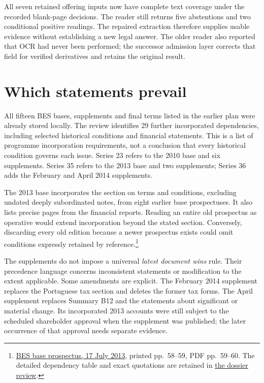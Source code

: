 \documentclass[11pt,a4paper]{article}
\begin{document}
All seven retained offering inputs now have complete text coverage under the
recorded blank-page decisions. The reader still returns five abstentions and
two conditional positive readings. The repaired extraction therefore supplies
usable evidence without establishing a new legal answer. The older reader also
reported that OCR had never been performed; the successor admission layer
corrects that field for verified derivatives and retains the original result.

\section*{Which statements prevail}

All fifteen BES bases, supplements and final terms listed in the earlier plan
were already stored locally. The review identifies 29 further incorporated
dependencies, including selected historical conditions and financial statements.
This is a list of programme incorporation requirements, not a conclusion that
every historical condition governs each issue. Series 23 refers to the 2010
base and six supplements. Series 35 refers to the 2013 base and two supplements;
Series 36 adds the February and April 2014 supplements.

The 2013 base incorporates the section on terms and conditions, excluding
undated deeply subordinated notes, from eight earlier base prospectuses. It also
lists precise pages from the financial reports. Reading an entire old prospectus
as operative would extend incorporation beyond the stated section. Conversely,
discarding every old edition because a newer prospectus exists could omit
conditions expressly retained by reference.\footnote{\href{../../prospectus/corner-cases-2026-10-04/sources/jur-more-bes-1774077/source.pdf}{BES base prospectus, 17 July 2013}, printed pp.~58--59, PDF pp.~59--60. The detailed dependency table and exact quotations are retained in \href{DOSSIER-REVIEW.md}{the dossier review}.}

The supplements do not impose a universal \emph{latest document wins} rule.
Their precedence language concerns inconsistent statements or modification to
the extent applicable. Some amendments are explicit. The February 2014
supplement replaces the Portuguese tax section and deletes the former tax
forms. The April supplement replaces Summary B12 and the statements about
significant or material change. Its incorporated 2013 accounts were still
subject to the scheduled shareholder approval when the supplement was
published; the later occurrence of that approval needs separate evidence.
\end{document}

